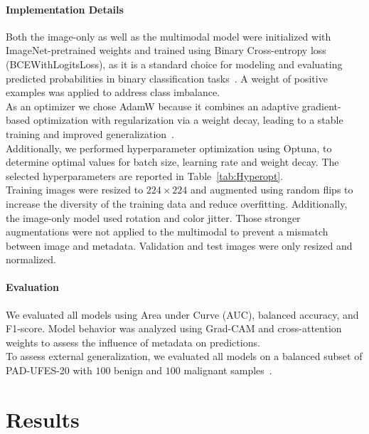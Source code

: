 \documentclass{article}
\begin{document}
	\paragraph{Implementation Details} 
	Both the image-only as well as the multimodal model were initialized with ImageNet-pretrained weights and trained using Binary Cross-entropy loss (BCEWithLogitsLoss), as it is a standard choice for modeling and evaluating predicted probabilities in binary classification tasks~\citep{binary_cross_entropy_ruby2020}. A weight of positive examples was applied to address class imbalance.\\
	As an optimizer we chose AdamW because it combines an adaptive gradient-based optimization with regularization via a weight decay, leading to a stable training and improved generalization~\citep{loshchilov2019decoupledweightdecayregularization}.\\
	Additionally, we performed hyperparameter optimization using Optuna, to determine optimal values for batch size, learning rate and weight decay. The selected hyperparameters are reported in Table~\ref{tab:Hyperopt}.\\
	Training images were resized to $224 \times 224$ and augmented using random flips to increase the diversity of the training data and reduce overfitting. Additionally, the image-only model used rotation and color jitter. Those stronger augmentations were not applied to the multimodal to prevent a mismatch between image and metadata. Validation and test images were only resized and normalized.
	
	\paragraph{Evaluation}
	We evaluated all models using Area under Curve (AUC), balanced accuracy, and F1-score. Model behavior was analyzed using Grad-CAM and cross-attention weights to assess the influence of metadata on predictions.\\
	To assess external generalization, we evaluated all models on a balanced subset of PAD-UFES-20 with $100$ benign and $100$ malignant samples~\citep{PACHECO2020103545}.
	

	
	
	\section{Results}
	
\end{document}
